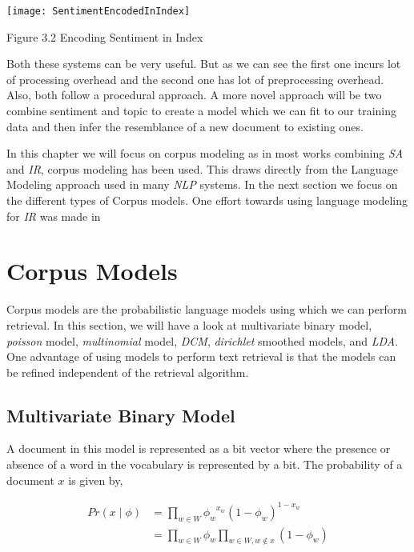 \texttt{[image: SentimentEncodedInIndex]}
\begin{center}
 Figure 3.2 Encoding Sentiment in Index
\end{center}

Both these systems can be very useful. But as we can see the first one incurs lot of processing overhead and the second one has lot of 
preprocessing overhead. Also, both follow a procedural approach. A more novel approach will be two combine sentiment and topic to create 
a model which we can fit to our training data and then infer the resemblance of a new document to existing ones.

In this chapter we will focus on corpus modeling as in most works combining \textit{SA} and \textit{IR}, corpus modeling has been used. 
This draws directly from the Language Modeling approach used in many \textit{NLP} systems. In the next section we focus on the different
types of Corpus models. One effort towards using language modeling for \textit{IR} was made in \citep*{ponte1998language}

\section{Corpus Models}

Corpus models are the probabilistic language models using which we can perform retrieval. In this section, we will have a look 
at multivariate binary model, \textit{poisson} model, \textit{multinomial} model, \textit{DCM}, \textit{dirichlet} smoothed models, and \textit{LDA}. 
One advantage of using models to perform text retrieval is that the models can be refined independent of the retrieval algorithm. 

\subsection{Multivariate Binary Model}

A document in this model is represented as a bit vector where the presence or absence of a word in the vocabulary is represented 
by a bit. The probability of a document \(x\) is given by,

\begin{align}\label{eqn:multivariatebinary}
Pr(x \mid \phi )	& = \prod_{w \in W} {\phi_w}^{x_w}{(1-\phi_w)}^{1-x_w}\\
			& = \prod_{w \in W} \phi_w \prod_{w \in W, w \notin x} (1-\phi_w)
\end{align}

